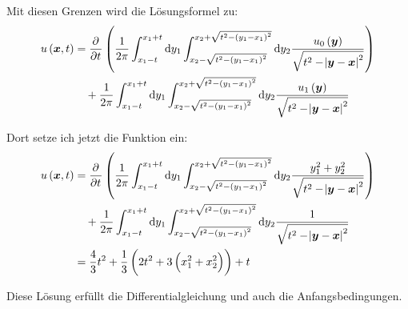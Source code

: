 \documentclass[11pt, ngerman, fleqn]{article}
\renewcommand{\vec}[1]{\boldsymbol{#1}}
\begin{document}
Mit diesen Grenzen wird die Lösungsformel zu:
\begin{align*}
	u\del{\vec x, t} &= \dpd{}t \del{
		\frac{1}{2 \pi}
		\int_{x_1 - t}^{x_1 + t} \dif y_1
		\int_{x_2 - \sqrt{t^2-\del{y_1 - x_1}^2}}^{x_2 + \sqrt{t^2-\del{y_1 - x_1}^2}} \dif y_2
		\frac{u_0\del{\vec y}}{\sqrt{t^2 - \abs{\vec y - \vec x}^2}}
	} \\
	&\quad+
	\frac{1}{2 \pi}
	\int_{x_1 - t}^{x_1 + t} \dif y_1
	\int_{x_2 - \sqrt{t^2-\del{y_1 - x_1}^2}}^{x_2 + \sqrt{t^2-\del{y_1 - x_1}^2}} \dif y_2
	\frac{u_1\del{\vec y}}{\sqrt{t^2 - \abs{\vec y - \vec x}^2}}
\end{align*}

Dort setze ich jetzt die Funktion ein:
\begin{align*}
	u\del{\vec x, t} &= \dpd{}t \del{
		\frac{1}{2 \pi}
		\int_{x_1 - t}^{x_1 + t} \dif y_1
		\int_{x_2 - \sqrt{t^2-\del{y_1 - x_1}^2}}^{x_2 + \sqrt{t^2-\del{y_1 - x_1}^2}} \dif y_2
		\frac{y_1^2 + y_2^2}{\sqrt{t^2 - \abs{\vec y - \vec x}^2}}
	} \\
	&\quad+
	\frac{1}{2 \pi}
	\int_{x_1 - t}^{x_1 + t} \dif y_1
	\int_{x_2 - \sqrt{t^2-\del{y_1 - x_1}^2}}^{x_2 + \sqrt{t^2-\del{y_1 - x_1}^2}} \dif y_2
	\frac{1}{\sqrt{t^2 - \abs{\vec y - \vec x}^2}} \\
	&= \frac 43 t^2 + \frac 13 \del{2t^2 + 3 \del{x_1^2 + x_2^2}} + t
\end{align*}

Diese Lösung erfüllt die Differentialgleichung und auch die Anfangsbedingungen.

%
%
\end{document}
